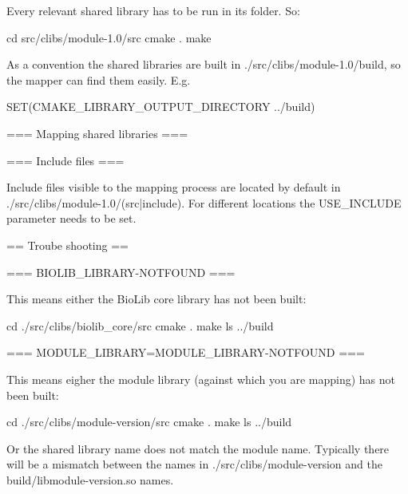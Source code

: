 Every relevant shared library has to be run in its folder. So:

  cd src/clibs/module-1.0/src
	cmake .
	make

As a convention the shared libraries are built in
./src/clibs/module-1.0/build, so the mapper can find them easily. E.g.

  SET(CMAKE_LIBRARY_OUTPUT_DIRECTORY ../build)

=== Mapping shared libraries ===



=== Include files ===

Include files visible to the mapping process are located by default in
./src/clibs/module-1.0/(src|include). For different locations the
USE_INCLUDE parameter needs to be set.

== Troube shooting ==

=== BIOLIB_LIBRARY-NOTFOUND ===

This means either the BioLib core library has not been built:

  cd ./src/clibs/biolib_core/src
	cmake .
	make
	ls ../build

=== MODULE_LIBRARY=MODULE_LIBRARY-NOTFOUND ===

This means eigher the module library (against which you are mapping) has not
been built:

  cd ./src/clibs/module-version/src
	cmake .
	make
	ls ../build

Or the shared library name does not match the module name. Typically
there will be a mismatch between the names in
./src/clibs/module-version and the build/libmodule-version.so names.

